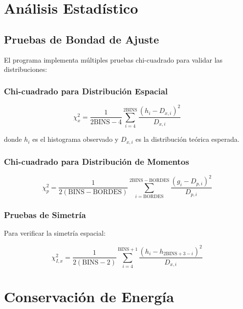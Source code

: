 \documentclass[12pt,a4paper]{article}
\begin{document}
\section{Análisis Estadístico}

\subsection{Pruebas de Bondad de Ajuste}

El programa implementa múltiples pruebas chi-cuadrado para validar las distribuciones:

\subsubsection{Chi-cuadrado para Distribución Espacial}

\begin{equation}
\chi^2_x = \frac{1}{2\text{BINS} - 4} \sum_{i=4}^{2\text{BINS}} \frac{(h_i - D_{x,i})^2}{D_{x,i}}
\end{equation}

donde $h_i$ es el histograma observado y $D_{x,i}$ es la distribución teórica esperada.

\subsubsection{Chi-cuadrado para Distribución de Momentos}

\begin{equation}
\chi^2_p = \frac{1}{2(\text{BINS} - \text{BORDES})} \sum_{i=\text{BORDES}}^{2\text{BINS}-\text{BORDES}} \frac{(g_i - D_{p,i})^2}{D_{p,i}}
\end{equation}

\subsubsection{Pruebas de Simetría}

Para verificar la simetría espacial:

\begin{equation}
\chi^2_{I,x} = \frac{1}{2(\text{BINS} - 2)} \sum_{i=4}^{\text{BINS}+1} \frac{(h_i - h_{2\text{BINS}+3-i})^2}{D_{x,i}}
\end{equation}

\section{Conservación de Energía}
\end{document}
